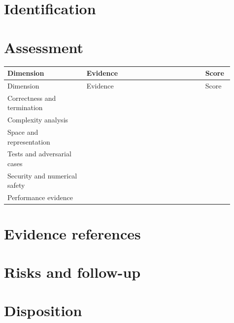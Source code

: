 \documentclass[11pt,letterpaper]{article}
\begin{document}
\tableofcontents
\clearpage
{}
\section{Identification}
\section{Assessment}
\small
\begin{longtable}{@{}p{0.32\linewidth}p{0.48\linewidth}p{0.11\linewidth}@{}}\toprule Dimension & Evidence & Score\\\midrule\endfirsthead\toprule Dimension & Evidence & Score\\\midrule\endhead
Correctness and termination & & \\[1.35em]
Complexity analysis & & \\[1.35em]
Space and representation & & \\[1.35em]
Tests and adversarial cases & & \\[1.35em]
Security and numerical safety & & \\[1.35em]
Performance evidence & & \\[1.35em]
\bottomrule\end{longtable}\normalsize
\section{Evidence references}
\section{Risks and follow-up}
\section{Disposition}
\end{document}
